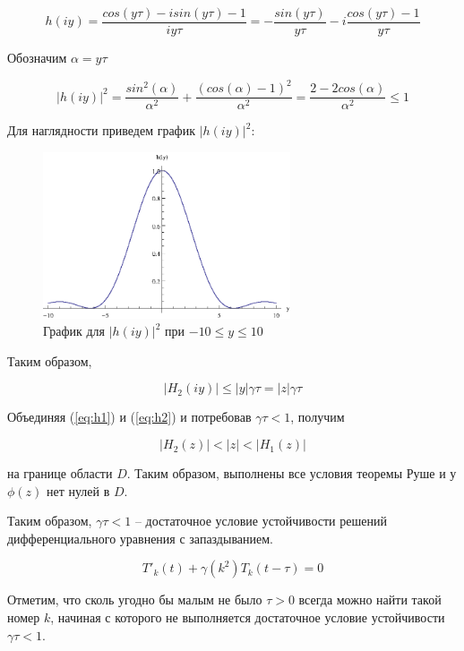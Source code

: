 \begin{equation}
h(iy) = \dfrac{cos(y \tau) - i sin(y \tau) - 1}{iy \tau} = -\dfrac{sin(y \tau)}{y \tau} - i \dfrac{cos(y \tau)-1}{y \tau}
\end{equation}

Обозначим $\alpha = y \tau$

\begin{equation}
{|h(iy)|}^2 = \dfrac{sin^2(\alpha)}{\alpha^2} + \dfrac{(cos(\alpha)-1)^2}{\alpha^2} = \dfrac{2-2cos(\alpha)}{\alpha^2} \leq 1
\end{equation}

Для наглядности приведем график ${|h(iy)|}^2$:

\begin{figure}[h]
\begin{center}
\includegraphics[width=0.65\textwidth]{./2_analysis/proof.eps}
\end{center}
\caption{График для ${|h(iy)|}^2$ при $-10 \leq y \leq 10$}
\end{figure}

Таким образом,

\begin{equation}\label{eq:h2}
|H_2(iy)| \leq |y| \gamma \tau = |z| \gamma \tau
\end{equation}

Объединяя (\ref{eq:h1}) и (\ref{eq:h2}) и потребовав $\gamma \tau < 1$, получим

\begin{equation}
|H_2(z)| < |z| < |H_1(z)|
\end{equation}

на границе области $D$. Таким образом, выполнены все условия теоремы Руше и у $\phi(z)$ нет нулей в $D$.

Таким образом, $\gamma \tau < 1$ \--- достаточное условие устойчивости решений дифференциального уравнения с запаздыванием.

\begin{equation}
{T'}_{k}(t) + \gamma(k^2) T_k (t-\tau)=0
\end{equation}

Отметим, что сколь угодно бы малым не было $\tau>0$ всегда можно найти такой номер $k$, начиная с которого не выполняется достаточное условие устойчивости $\gamma \tau < 1$.